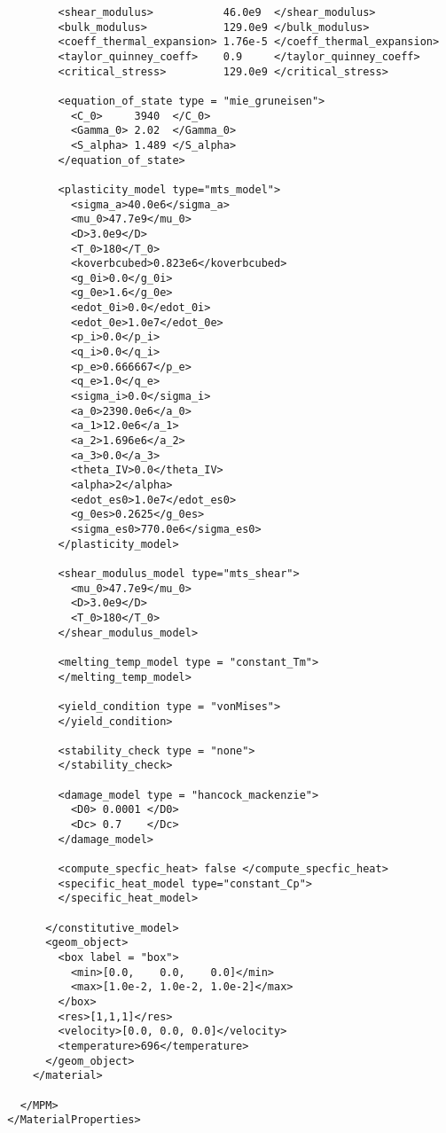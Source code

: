 \begin{verbatim}
          <shear_modulus>           46.0e9  </shear_modulus>
          <bulk_modulus>            129.0e9 </bulk_modulus>
          <coeff_thermal_expansion> 1.76e-5 </coeff_thermal_expansion>
          <taylor_quinney_coeff>    0.9     </taylor_quinney_coeff>
          <critical_stress>         129.0e9 </critical_stress>

          <equation_of_state type = "mie_gruneisen">
            <C_0>     3940  </C_0>
            <Gamma_0> 2.02  </Gamma_0>
            <S_alpha> 1.489 </S_alpha>
          </equation_of_state>
          
          <plasticity_model type="mts_model">
            <sigma_a>40.0e6</sigma_a>
            <mu_0>47.7e9</mu_0>
            <D>3.0e9</D>
            <T_0>180</T_0>
            <koverbcubed>0.823e6</koverbcubed>
            <g_0i>0.0</g_0i>
            <g_0e>1.6</g_0e>
            <edot_0i>0.0</edot_0i>
            <edot_0e>1.0e7</edot_0e>
            <p_i>0.0</p_i>
            <q_i>0.0</q_i>
            <p_e>0.666667</p_e>
            <q_e>1.0</q_e>
            <sigma_i>0.0</sigma_i>
            <a_0>2390.0e6</a_0>
            <a_1>12.0e6</a_1>
            <a_2>1.696e6</a_2>
            <a_3>0.0</a_3>
            <theta_IV>0.0</theta_IV>
            <alpha>2</alpha>
            <edot_es0>1.0e7</edot_es0>
            <g_0es>0.2625</g_0es>
            <sigma_es0>770.0e6</sigma_es0>
          </plasticity_model>

          <shear_modulus_model type="mts_shear">
            <mu_0>47.7e9</mu_0>
            <D>3.0e9</D>
            <T_0>180</T_0>
          </shear_modulus_model>

          <melting_temp_model type = "constant_Tm">
          </melting_temp_model>

          <yield_condition type = "vonMises">
          </yield_condition>

          <stability_check type = "none">
          </stability_check>

          <damage_model type = "hancock_mackenzie">
            <D0> 0.0001 </D0>
            <Dc> 0.7    </Dc>
          </damage_model>
          
          <compute_specfic_heat> false </compute_specfic_heat>
          <specific_heat_model type="constant_Cp">
          </specific_heat_model>
          
        </constitutive_model>
        <geom_object>
          <box label = "box">
            <min>[0.0,    0.0,    0.0]</min>
            <max>[1.0e-2, 1.0e-2, 1.0e-2]</max>
          </box>
          <res>[1,1,1]</res>
          <velocity>[0.0, 0.0, 0.0]</velocity>
          <temperature>696</temperature>
        </geom_object>
      </material>

    </MPM>
  </MaterialProperties>
  \end{verbatim}

